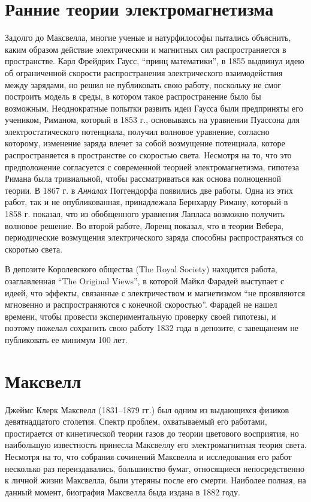 \documentclass[12pt, oneside, a4paper]{article}
\begin{document}
\section{Ранние теории электромагнетизма}
Задолго до Максвелла, многие ученые и натурфилософы пытались объяснить, каким образом действие электрическии и магнитных  сил распространяется в пространстве. Карл Фрейдрих Гаусс, ``принц математики'', в 1855 выдвинул идею об ограниченной скорости распространения электрического взаимодействия между зарядами, но решил не публиковать свою работу, поскольку не смог построить модель в среды, в котором такое распространение было бы возможным. Неоднократные попытки развить идеи Гаусса были предприняты его учеником, Риманом, который в 1853 г., основываясь на уравнении Пуассона для электростатического потенциала, получил волновое уравнение, согласно которому, изменение заряда влечет за собой возмущение потенциала, которе распространяется в пространстве со скоростью света. Несмотря на то, что это предположение согласуется с современной теорией электромагнетизма, гипотеза Римана была тривиальной, чтобы рассматриваться как основа полноценной теории. В 1867 г. в \emph{Анналах} Поггендорфа появились две работы. Одна из этих работ, так и не опубликованная, принадлежала Бернхарду Риману, который в 1858 г. показал, что из обобщенного уравнения Лапласа возможно получить волновое решение. Во второй работе, Лоренц показал, что в теории Вебера, периодические возмущения электрического заряда способны распространяться со скоротью света.

В депозите Королевского общества (The Royal Society) находится работа, озаглавленная ``The Original Views'', в которой Майкл Фарадей выступает с идеей, что эффекты, связанные с электричеством и магнетизмом ``не проявляются мгновенно и распространяются с конечной скоростью''. Фарадей не нашел времени, чтобы провести экспериментальную проверку своей гипотезы, и поэтому пожелал сохранить свою работу 1832 года в депозите, с завещанеим не публиковать ее минимум 100 лет.
\section{Максвелл}
Джеймс Клерк Максвелл (1831--1879 гг.) был одним из выдающихся физиков девятнадцатого столетия. Спектр проблем, охватываемый его работами, простирается от кинетической теории газов до теории цветового восприятия, но наибольшую известность принесла Максвеллу его электромагнитная теория света. Несмотря на то, что собрания сочинений Максвелла и исследования его работ несколько раз переиздавались, большинство бумаг, относящиеся непосредственно к личной жизни Максвелла, были утеряны после его смерти. Наиболее полная, на данный момент, биография Максвелла быда издана в 1882 году.
\end{document}
